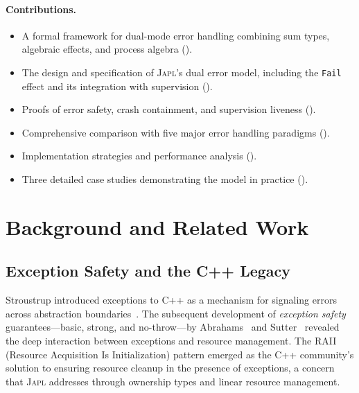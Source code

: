 \documentclass[11pt,twocolumn]{article}
\newcommand{\japl}{\textsc{Japl}}
\newcommand{\Fail}{\texttt{Fail}}
\begin{document}
\paragraph{Contributions.}
\begin{itemize}[leftmargin=*]
  \item A formal framework for dual-mode error handling combining sum types, algebraic effects, and process algebra ().
  \item The design and specification of \japl{}'s dual error model, including the \Fail{} effect and its integration with supervision ().
  \item Proofs of error safety, crash containment, and supervision liveness ().
  \item Comprehensive comparison with five major error handling paradigms ().
  \item Implementation strategies and performance analysis ().
  \item Three detailed case studies demonstrating the model in practice ().
\end{itemize}

\section{Background and Related Work}\label{sec:background}

\subsection{Exception Safety and the C++ Legacy}

Stroustrup introduced exceptions to C++ as a mechanism for signaling errors across abstraction boundaries~\cite{stroustrup1994design}. The subsequent development of \emph{exception safety} guarantees---basic, strong, and no-throw---by Abrahams~\cite{abrahams2000exception} and Sutter~\cite{sutter1999exceptional} revealed the deep interaction between exceptions and resource management. The RAII (Resource Acquisition Is Initialization) pattern emerged as the C++ community's solution to ensuring resource cleanup in the presence of exceptions, a concern that \japl{} addresses through ownership types and linear resource management.
\end{document}
